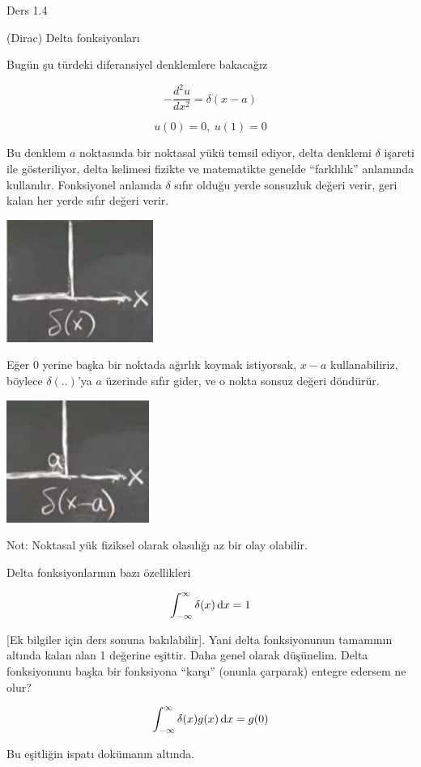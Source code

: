 \documentclass[12pt,fleqn]{article}\usepackage{../../common}
\begin{document}
Ders 1.4

(Dirac) Delta fonksiyonları

Bugün şu türdeki diferansiyel denklemlere bakacağız

$$ -\frac{d^2u}{dx^2}=\delta(x-a) $$

$$ u(0) = 0, \ u(1) = 0 $$

Bu denklem $a$ noktasında bir noktasal yükü temsil ediyor, delta denklemi
$\delta$ işareti ile gösteriliyor, delta kelimesi fizikte ve matematikte
genelde ``farklılık'' anlamında kullanılır. Fonksiyonel anlamda $\delta$
sıfır olduğu yerde sonsuzluk değeri verir, geri kalan her yerde sıfır
değeri verir.

\includegraphics[height=4cm]{4_1.png}

Eğer 0 yerine başka bir noktada ağırlık koymak istiyorsak, $x-a$
kullanabiliriz, böylece $\delta(..)$'ya $a$ üzerinde sıfır gider, ve o
nokta sonsuz değeri döndürür.

\includegraphics[height=4cm]{4_2.png} 

Not: Noktasal yük fiziksel olarak olasılığı az bir olay olabilir. 

Delta fonksiyonlarının bazı özellikleri

$$ \int_{-\infty}^{\infty} \delta(x) \,\mathrm{d} x = 1 $$

[Ek bilgiler için ders sonuna bakılabilir]. Yani delta fonksiyonunun tamamının
altında kalan alan 1 değerine eşittir. Daha genel olarak düşünelim. Delta
fonksiyonunu başka bir fonksiyona ``karşı'' (onunla çarparak) entegre edersem ne
olur?

$$ \int_{-\infty}^{\infty} \delta(x)g(x) \,\mathrm{d} x = g(0)$$

Bu eşitliğin ispatı dokümanın altında.
\end{document}

